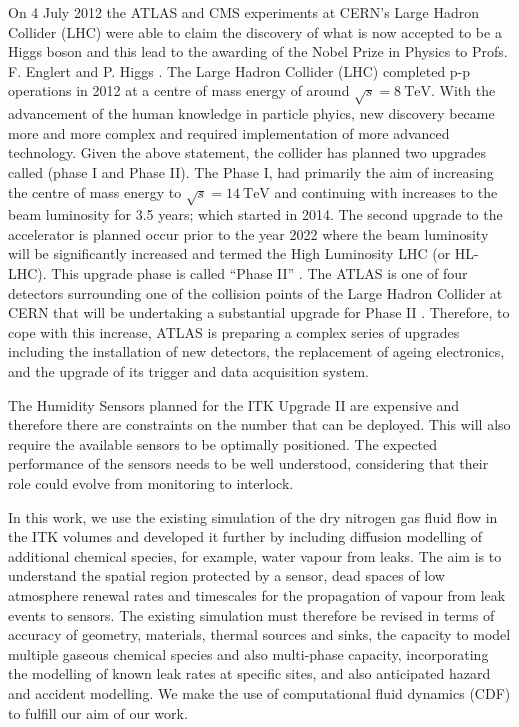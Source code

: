 \documentclass[a4paper]{jpconf}
\begin{document}
On 4 July 2012 the ATLAS \cite{1} and CMS experiments at CERN’s Large Hadron Collider (LHC) \cite{2}
were able to claim the discovery of what is now accepted to be a Higgs boson \cite{3} and this lead
 to the awarding of the Nobel Prize in Physics to Profs. F. Englert and P. Higgs \cite{4}. The
Large Hadron Collider (LHC) completed p-p operations in 2012 at a centre of mass energy of
around $\sqrt{s} = 8~ \mbox{TeV}$. With the advancement of the human knowledge in particle phyics, new discovery became more and more complex and required implementation of more advanced technology. Given the above
statement, the collider has planned two upgrades called (phase I and Phase II). 
The Phase I, had primarily the aim of increasing the centre of mass energy to $\sqrt{s} = 14 ~\mbox{TeV}$ and continuing with increases to the beam luminosity for 3.5 years; which started in 2014.
The second upgrade to the accelerator is planned occur prior to the year 2022 where the beam luminosity
will be significantly increased and termed the High Luminosity LHC (or HL-LHC). This upgrade
phase is called “Phase II” \cite{5}. The ATLAS \cite{1} is one of four detectors surrounding one of the collision points of the Large Hadron Collider at CERN that will be undertaking a substantial upgrade for Phase II \cite{6}.
Therefore, to cope with this increase, ATLAS is preparing a complex series of upgrades including the installation of new detectors, the replacement of ageing electronics, and the upgrade of its trigger and data acquisition system.

 
The Humidity Sensors planned for the ITK Upgrade II are expensive and therefore there are
constraints on the number that can be deployed. This will also require the available sensors to
be optimally positioned. The expected performance of the sensors needs to be well
understood, considering that their role could evolve from monitoring to interlock. 

In this work, we use the existing simulation of the dry nitrogen gas fluid flow in the ITK volumes \cite{7} and developed it further by including diffusion modelling of additional chemical species, for example, water vapour from leaks. The aim is to understand the spatial region protected by a sensor, dead spaces of low atmosphere renewal rates and timescales for the propagation of vapour from leak events to sensors. The existing simulation must therefore
be revised in terms of accuracy of geometry, materials, thermal sources and sinks, the
capacity to model multiple gaseous chemical species and also multi-phase capacity, incorporating the modelling of known leak rates at specific sites, and also anticipated hazard and accident modelling. 
We make the use of computational fluid dynamics (CDF) to fulfill our aim of our work.
\end{document}
